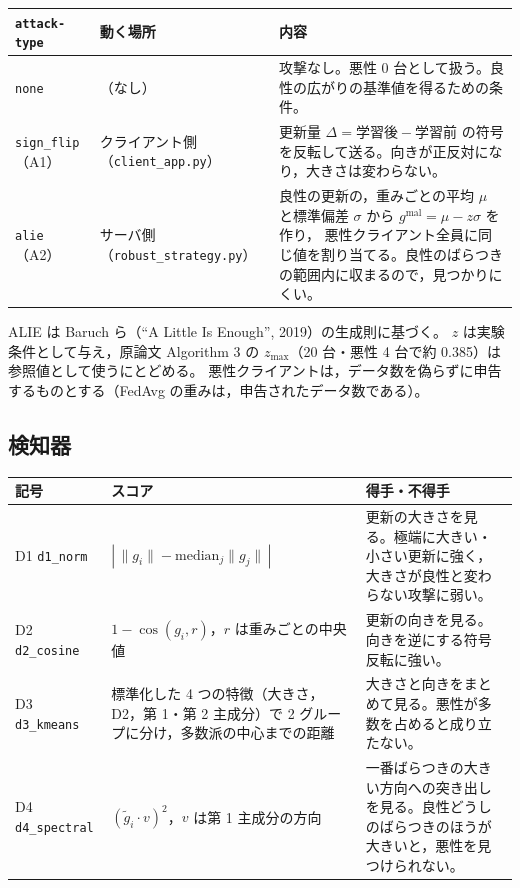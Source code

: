 \documentclass[a4j, dvipdfmx]{jsarticle}  %
\begin{document}
\begin{table}[H]
\centering
\begin{tabular}{@{}P{2.6cm} P{4.0cm} P{8.7cm}@{}}
\toprule
\texttt{attack-type} & 動く場所 & 内容 \\
\midrule
\texttt{none} & （なし） & 攻撃なし。悪性 0 台として扱う。良性の広がりの基準値を得るための条件。 \\
\texttt{sign\_flip}（A1） & クライアント側（\texttt{client\_app.py}） &
更新量 $\Delta = \text{学習後} - \text{学習前}$ の符号を反転して送る。向きが正反対になり，大きさは変わらない。 \\
\texttt{alie}（A2） & サーバ側（\texttt{robust\_strategy.py}） &
良性の更新の，重みごとの平均 $\mu$ と標準偏差 $\sigma$ から $g^{\text{mal}} = \mu - z\sigma$ を作り，
悪性クライアント全員に同じ値を割り当てる。良性のばらつきの範囲内に収まるので，見つかりにくい。 \\
\bottomrule
\end{tabular}
\end{table}

ALIE は Baruch ら（``A Little Is Enough'', 2019）の生成則に基づく。
$z$ は実験条件として与え，原論文 Algorithm 3 の $z_{\max}$（20 台・悪性 4 台で約 0.385）は参照値として使うにとどめる。
悪性クライアントは，データ数を偽らずに申告するものとする（FedAvg の重みは，申告されたデータ数である）。

\subsection{検知器}

\begin{table}[H]
\centering
\begin{tabular}{@{}P{2.4cm} P{6.0cm} P{6.9cm}@{}}
\toprule
記号 & スコア & 得手・不得手 \\
\midrule
D1 \texttt{d1\_norm} & $|\,\|g_i\| - \mathrm{median}_j\|g_j\|\,|$ &
更新の大きさを見る。極端に大きい・小さい更新に強く，大きさが良性と変わらない攻撃に弱い。 \\
D2 \texttt{d2\_cosine} & $1 - \cos(g_i, r)$，$r$ は重みごとの中央値 &
更新の向きを見る。向きを逆にする符号反転に強い。 \\
D3 \texttt{d3\_kmeans} & 標準化した 4 つの特徴（大きさ，D2，第 1・第 2 主成分）で 2 グループに分け，多数派の中心までの距離 &
大きさと向きをまとめて見る。悪性が多数を占めると成り立たない。 \\
D4 \texttt{d4\_spectral} & $(\tilde{g}_i \cdot v)^2$，$v$ は第 1 主成分の方向 &
一番ばらつきの大きい方向への突き出しを見る。良性どうしのばらつきのほうが大きいと，悪性を見つけられない。 \\
\bottomrule
\end{tabular}
\end{table}
\end{document}
